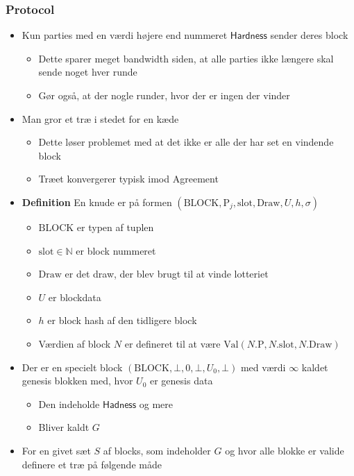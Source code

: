 \documentclass[a4, english]{article}
\begin{document}
\subsubsection{Protocol}
\begin{itemize}
	\item Kun parties med en værdi højere end nummeret $\mathsf{Hardness}$ sender deres block
  \begin{itemize}
  	\item Dette sparer meget bandwidth siden, at alle parties ikke længere skal sende noget hver runde
    \item Gør også, at der nogle runder, hvor der er ingen der vinder 
  \end{itemize}
  \item Man gror et træ i stedet for en kæde
  \begin{itemize}
  	\item Dette løser problemet med at det ikke er alle der har set en vindende block
    \item Træet konvergerer typisk imod Agreement 
  \end{itemize}
  \item \textbf{Definition} En knude er på formen $(\text{BLOCK}, \text{P}_j, \text{slot}, \text{Draw}, U,h, \sigma)$
  \begin{itemize}
		\item $\text{BLOCK}$ er typen af tuplen
		\item $\text{slot} \in \mathbb N$ er block nummeret 
		\item $\text{Draw}$ er det draw, der blev brugt til at vinde lotteriet
		\item $U$ er blockdata
		\item $h$ er block hash af den tidligere block
  	\item Værdien af block $N$ er defineret til at være $\text{Val}(N.\text{P}, N.\text{slot}, N.\text{Draw})$
  \end{itemize}
  \item Der er en specielt block $(\text{BLOCK}, \bot, 0, \bot, U_0, \bot)$ med værdi $\infty$ kaldet genesis blokken med, hvor $U_0$ er genesis data
  \begin{itemize}
  	\item Den indeholde $\mathsf{Hadness}$ og mere
    \item Bliver kaldt $G$  
  \end{itemize}
  \item For en givet sæt $S$ af blocks, som indeholder $G$ og hvor alle blokke er valide definere et træ på følgende måde

\end{itemize}
\end{document}
